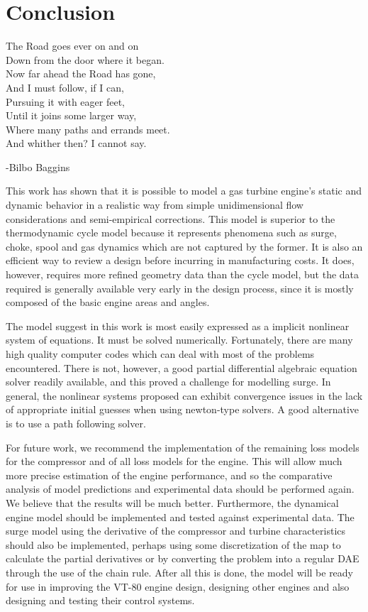 \documentclass[tcc]{subfiles}
\begin{document}
\chapter{Conclusion}
\label{ch:conclusion}
        \epigraph{\centering
        The Road goes ever on and on     \\
        Down from the door where it began.\\
        Now far ahead the Road has gone,\\
        And I must follow, if I can,\\
        Pursuing it with eager feet,\\
        Until it joins some larger way,\\
        Where many paths and errands meet.\\
        And whither then? I cannot say.
        }{-Bilbo Baggins}

        This work has shown that it is possible to model a gas turbine engine's static and dynamic behavior in a realistic way from simple unidimensional flow considerations 
        and semi-empirical corrections. This model is superior to the thermodynamic cycle model because it represents phenomena such as surge, choke, spool and gas dynamics 
        which are not captured by the former. It is also an efficient way to review a design before incurring in manufacturing costs.
        It does, however, requires more refined geometry data than the cycle model, but the data required is generally available very early in the design process, since it is mostly composed of the basic engine areas and angles.
        
        The model suggest in this work is most easily expressed as a implicit nonlinear system of equations. 
        It must be solved numerically. Fortunately, there are many high quality computer codes which can deal with most of the problems encountered.
        There is not, however, a good partial differential algebraic equation solver readily available, and this proved a challenge for modelling surge.
        In general, the nonlinear systems proposed can exhibit convergence issues in the lack of appropriate initial guesses when using newton-type solvers.
        A good alternative is to use a path following solver.

        For future work, we recommend the implementation of the remaining loss models for the compressor and of all loss models for the engine.
        This will allow much more precise estimation of the engine performance, and so the comparative analysis of model predictions and experimental data should be performed again. 
        We believe that the results will be much better.
        Furthermore, the dynamical engine model should be implemented and tested against experimental data. The surge model using the derivative of the compressor and turbine characteristics should also be implemented, perhaps using some discretization of the map to calculate the partial derivatives or by converting the problem into a regular \ac{DAE} through the use of the chain rule.
        After all this is done, the model will be ready for use in improving the VT-80 engine design, designing other engines and also designing and testing their control systems.
\end{document}
